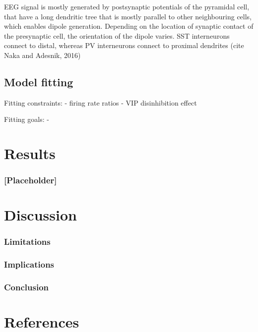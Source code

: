 \documentclass[11pt,a4paper,onecolumn]{article}
\begin{document}
EEG signal is mostly generated by postsynaptic potentials of the pyramidal cell, that have a long dendritic tree that is mostly parallel to other neighbouring cells, which enables dipole generation. Depending on the location of synaptic contact of the presynaptic cell, the orientation of the dipole varies. 
SST interneurons connect to distal, whereas PV interneurons connect to proximal dendrites (cite Naka and Adesnik, 2016) 

\subsection*{Model fitting}
\vspace{-7pt}
Fitting constraints:
- firing rate ratios 
- VIP disinhibition effect

Fitting goals:
- 

\section*{Results}

\subsubsection*{[Placeholder]}
\vspace{-7pt}


\section*{Discussion}

\subsubsection*{Limitations}
\vspace{-7pt}

\subsubsection*{Implications}
\vspace{-7pt}

\subsubsection*{Conclusion}
\vspace{-7pt}


\section*{References}

\vfill\null



\end{document}
